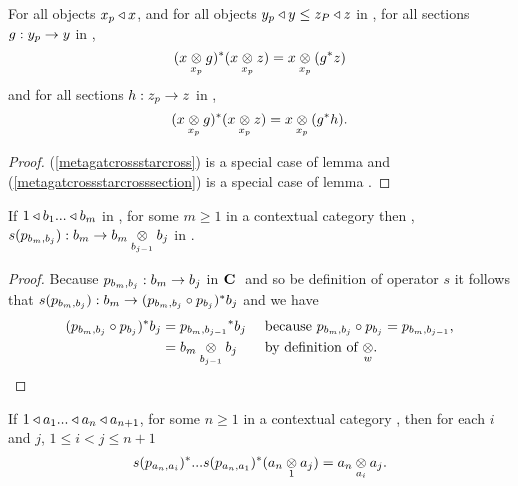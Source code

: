 
\vspace{0.15cm}
\begin{lemma}
For all objects $x_p \base x$, and for all objects $y_p \base y \leq z_P \base z$ in \catc, 
for all sections $g:y_p \morph y$ in \catc, 
\begin{equation}
\label{metagatcrossstarcross}
(\crossx{x}{g}{x_p})^*(\crossx{x}{z}{x_p})=\crossx{x}{(g^*z)}{x_p}
\end{equation}
and for all sections $h:z_p \morph z$ in \catc,
\begin{equation}
\label{metagatcrossstarcrosssection}
(\crossx{x}{g}{x_p})^*(\crossx{x}{z}{x_p})=\crossx{x}{(g^*h)}{x_p}.
\end{equation}
\end{lemma}
\begin{proof}
(\ref{metagatcrossstarcross}) is a special case of lemma 
and
(\ref{metagatcrossstarcrosssection}) is a special case of lemma .
\end{proof}
\begin{lemma}
If $1 \base b_1 ... \base b_m$ in \catc, for some $m \ge 1$ in a contextual category \catc then \foreachj,
$s(p_{b_m,b_j}): b_m \morph \crossx{b_m}{b_j}{b_{j-1}}$ in \catcw.
\end{lemma}
\begin{proof}
Because $p_{b_m,b_j}: b_m \morph b_j$ in $\catcw$ and so be definition of operator $s$ it follows that $s(p_{b_m,b_j}): b_m  \morph (p_{b_m,b_j} \circ p_{b_j})^*b_j$
and we have 
\begin{align*}
(p_{b_m,b_j} \circ p_{b_j})^*b_j &= {p_{b_m,b_{j-1}}} ^* b_j  && \mbox{ because $p_{b_m,b_j} \circ p_{b_j}=p_{b_m,b_{j-1}}$,} \\
                                 &= \crossx{b_m}{b_j}{b_{j-1}} && \mbox{ by definition of $\crossx{}{}{w}$}.
\end{align*}
\end{proof}
\begin{lemma}
If $1 \base a_1 ... \base a_n \base a_{n+1}$, for some $n \ge 1$ in a contextual category \catc, then 
for each $i$ and $j$, $1 \leq i < j \leq n+1$
\begin{equation*}
s(p_{a_{n},a_{i}})^*...s(p_{a_{n},a_1})^*(\crossx{a_{n}}{a_j}{1}) 
= \crossx{a_{n}}{a_j}{a_{i}}.
\end{equation*} 
\end{lemma}
